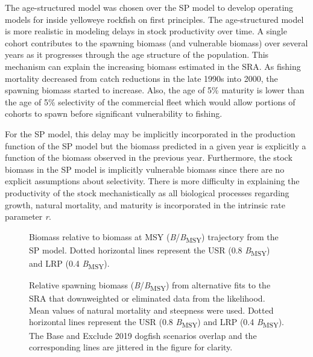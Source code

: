 \documentclass[11pt]{book}
\begin{document}
The age-structured model was chosen over the SP model to develop operating models for inside yelloweye rockfish on first principles. The age-structured model is more realistic in modeling delays in stock productivity over time. A single cohort contributes to the spawning biomass (and vulnerable biomass) over several years as it progresses through the age structure of the population. This mechanism can explain the increasing biomass estimated in the SRA. As fishing mortality decreased from catch reductions in the late 1990s into 2000, the spawning biomass started to increase. Also, the age of 5\% maturity is lower than the age of 5\% selectivity of the commercial fleet which would allow portions of cohorts to spawn before significant vulnerability to fishing.

For the SP model, this delay may be implicitly incorporated in the production function of the SP model but the biomass predicted in a given year is explicitly a function of the biomass observed in the previous year. Furthermore, the stock biomass in the SP model is implicitly vulnerable biomass since there are no explicit assumptions about selectivity. There is more difficulty in explaining the productivity of the stock mechanistically as all biological processes regarding growth, natural mortality, and maturity is incorporated in the intrinsic rate parameter \emph{r}.


\begin{figure}[htb]

{\centering {} 

}

\caption{Biomass relative to biomass at MSY (\emph{B}/\emph{B}\textsubscript{MSY}) trajectory from the SP model. Dotted horizontal lines represent the USR (0.8 \emph{B}\textsubscript{MSY}) and LRP (0.4 \emph{B}\textsubscript{MSY}).}\label{fig:spm-biomass}
\end{figure}

\begin{figure}[htb]

{\centering {} 

}

\caption{Relative spawning biomass (\emph{B}/\emph{B}\textsubscript{MSY}) from alternative fits to the SRA that downweighted or eliminated data from the likelihood. Mean values of natural mortality and steepness were used. Dotted horizontal lines represent the USR (0.8 \emph{B}\textsubscript{MSY}) and LRP (0.4 \emph{B}\textsubscript{MSY}). The Base and Exclude 2019 dogfish scenarios overlap and the corresponding lines are jittered in the figure for clarity.}\label{fig:alt-SRA-fit}
\end{figure}
\clearpage
\end{document}
